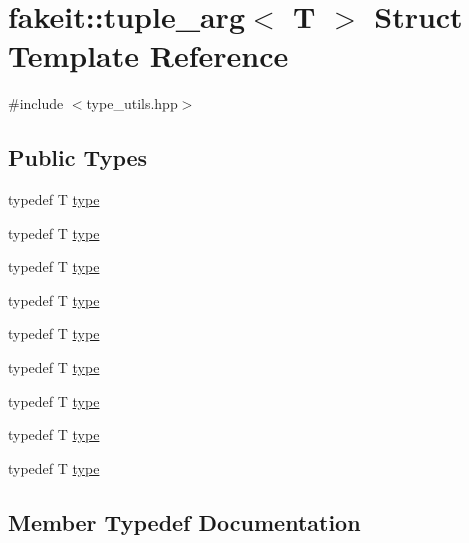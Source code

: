 \hypertarget{structfakeit_1_1tuple__arg}{}\section{fakeit\+::tuple\+\_\+arg$<$ T $>$ Struct Template Reference}
\label{structfakeit_1_1tuple__arg}


{\ttfamily \#include $<$type\+\_\+utils.\+hpp$>$}

\subsection*{Public Types}
\begin{DoxyCompactItemize}
\item 
typedef T \mbox{\hyperlink{structfakeit_1_1tuple__arg_abaa55c1c51c4f37325b54def32256f1d}{type}}
\item 
typedef T \mbox{\hyperlink{structfakeit_1_1tuple__arg_abaa55c1c51c4f37325b54def32256f1d}{type}}
\item 
typedef T \mbox{\hyperlink{structfakeit_1_1tuple__arg_abaa55c1c51c4f37325b54def32256f1d}{type}}
\item 
typedef T \mbox{\hyperlink{structfakeit_1_1tuple__arg_abaa55c1c51c4f37325b54def32256f1d}{type}}
\item 
typedef T \mbox{\hyperlink{structfakeit_1_1tuple__arg_abaa55c1c51c4f37325b54def32256f1d}{type}}
\item 
typedef T \mbox{\hyperlink{structfakeit_1_1tuple__arg_abaa55c1c51c4f37325b54def32256f1d}{type}}
\item 
typedef T \mbox{\hyperlink{structfakeit_1_1tuple__arg_abaa55c1c51c4f37325b54def32256f1d}{type}}
\item 
typedef T \mbox{\hyperlink{structfakeit_1_1tuple__arg_abaa55c1c51c4f37325b54def32256f1d}{type}}
\item 
typedef T \mbox{\hyperlink{structfakeit_1_1tuple__arg_abaa55c1c51c4f37325b54def32256f1d}{type}}
\end{DoxyCompactItemize}


\subsection{Member Typedef Documentation}
\mbox{\label{structfakeit_1_1tuple__arg_abaa55c1c51c4f37325b54def32256f1d}} 
